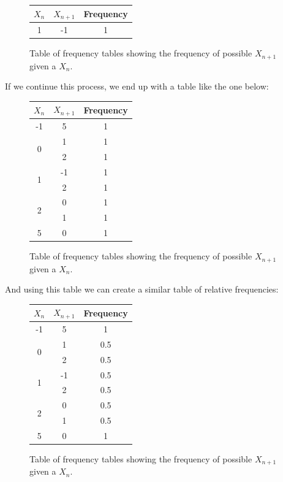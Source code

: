 \documentclass[12pt,final]{article}
\begin{document}
\begin{figure}[H]
	\begin{center}
 	\begin{tabular}{| c | c | c |}
	\hline
 	$X_n$ & $X_{n+1}$ & Frequency \\ \hline
  \multirow{1}{*}{1} & -1 & 1 \\ \hline
	\end{tabular}
 	\end{center}
	\caption{Table of frequency tables showing the frequency of possible $X_{n+1}$ given a $X_n$.}
 	\label{fig:changeinclosetableoffrequencytables}
\end{figure}

If we continue this process, we end up with a table like the one below:

\begin{figure}[H]
	\begin{center}
 	\begin{tabular}{| c | c | c |}
	\hline
 	$X_n$ & $X_{n+1}$ & Frequency \\ \hline
  \multirow{1}{*}{-1} & 5 & 1 \\ \hline
 	\multirow{2}{*}{0} & 1 & 1 \\
		& 2 & 1 \\ \hline
  \multirow{2}{*}{1} & -1 & 1 \\
		& 2 & 1 \\ \hline
 	\multirow{2}{*}{2} & 0 & 1 \\
		& 1 & 1 \\ \hline
	\multirow{1}{*}{5} & 0 & 1 \\ \hline
	\end{tabular}
 	\end{center}
	\caption{Table of frequency tables showing the frequency of possible $X_{n+1}$ given a $X_n$.}
 	\label{fig:changeinclosetableoffrequencytables2}
\end{figure}

And using this table we can create a similar table of relative frequencies:

\begin{figure}[H]
	\begin{center}
 	\begin{tabular}{| c | c | c |}
	\hline
 	$X_n$ & $X_{n+1}$ & Frequency \\ \hline
  \multirow{1}{*}{-1} & 5 & 1 \\ \hline
 	\multirow{2}{*}{0} & 1 & 0.5 \\
		& 2 & 0.5 \\ \hline
  \multirow{2}{*}{1} & -1 & 0.5 \\
		& 2 & 0.5 \\ \hline
 	\multirow{2}{*}{2} & 0 & 0.5 \\
		& 1 & 0.5 \\ \hline
	\multirow{1}{*}{5} & 0 & 1 \\ \hline
	\end{tabular}
 	\end{center}
	\caption{Table of frequency tables showing the frequency of possible $X_{n+1}$ given a $X_n$.}
 	\label{fig:changeinclosetableofrelativefrequencytables}
\end{figure}
\end{document}
